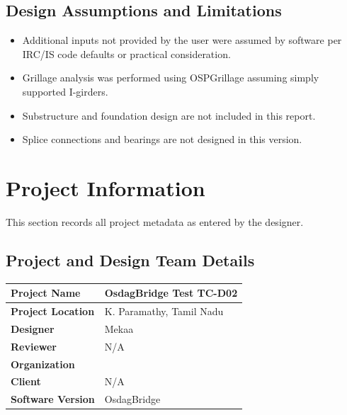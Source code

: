 \documentclass[12pt,a4paper]{report}
\numberwithin{table}{chapter}
\numberwithin{figure}{chapter}
\begin{document}
\section*{Design Assumptions and Limitations}
\label{sec:assumptions}

\begin{itemize}
\item Additional inputs not provided by the user were assumed by software per IRC/IS code defaults or practical consideration.
\item Grillage analysis was performed using OSPGrillage assuming simply supported I-girders.
\item Substructure and foundation design are not included in this report.
\item Splice connections and bearings are not designed in this version.
\end{itemize}

\titleformat{\chapter}[block]{\normalfont\Large\bfseries\centering}{\thechapter}{1em}{}
\titlespacing*{\chapter}{0pt}{-30pt}{10pt}


\chapter{Project Information}

This section records all project metadata as entered by the designer.

\section{Project and Design Team Details}
\label{sec:project-details}

\begin{tabular}{|L{5.5cm}|L{8.5cm}|}
\hline
\textbf{Project Name} & OsdagBridge Test TC-D02 \\
\hline
\textbf{Project Location} & K. Paramathy, Tamil Nadu \\
\hline
\textbf{Designer} & Mekaa \\
\hline
\textbf{Reviewer} & N/A \\
\hline
\textbf{Organization} &  \\
\hline
\textbf{Client} & N/A \\
\hline
\textbf{Software Version} & OsdagBridge \\
\hline
\end{tabular}
\end{document}
